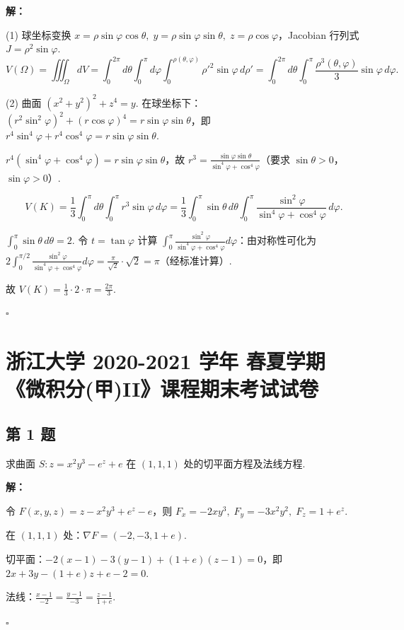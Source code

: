 \documentclass[12pt,a4paper]{article}
\newenvironment{sol}[1][解]{%
  \par\medskip\noindent\textbf{#1：}\itshape\par\noindent\ignorespaces
}{%
  \par\hfill$\square$\par\medskip
}
\begin{document}
\begin{sol}(1) 球坐标变换 $x=\rho\sin\varphi\cos\theta,\;
  y=\rho\sin\varphi\sin\theta,\; z=\rho\cos\varphi$，Jacobian 行列式
  $J=\rho^2\sin\varphi$.
  $$V(\Omega)=\iiint_{\Omega}dV=\int_0^{2\pi}d\theta\int_0^{\pi}d\varphi\int_0^{\rho(\theta,\varphi)}\rho'^2\sin\varphi\,d\rho'=\int_0^{2\pi}d\theta\int_0^{\pi}\frac{\rho^3(\theta,\varphi)}{3}\sin\varphi\,d\varphi.$$

  (2) 曲面 $(x^2+y^2)^2+z^4=y$. 在球坐标下：
  $(r^2\sin^2\varphi)^2+(r\cos\varphi)^4=r\sin\varphi\sin\theta$，即
  $r^4\sin^4\varphi+r^4\cos^4\varphi=r\sin\varphi\sin\theta$.

  $r^4(\sin^4\varphi+\cos^4\varphi)=r\sin\varphi\sin\theta$，故
  $r^3=\frac{\sin\varphi\sin\theta}{\sin^4\varphi+\cos^4\varphi}$（要求
  $\sin\theta>0$，$\sin\varphi>0$）.

  $$V(K)=\frac{1}{3}\int_0^{\pi}d\theta\int_0^{\pi}r^3\sin\varphi\,d\varphi=\frac{1}{3}\int_0^{\pi}\sin\theta\,d\theta\int_0^{\pi}\frac{\sin^2\varphi}{\sin^4\varphi+\cos^4\varphi}\,d\varphi.$$

  $\int_0^{\pi}\sin\theta\,d\theta=2$. 令 $t=\tan\varphi$ 计算
  $\int_0^{\pi}\frac{\sin^2\varphi}{\sin^4\varphi+\cos^4\varphi}d\varphi$：由对称性可化为
  $2\int_0^{\pi/2}\frac{\sin^2\varphi}{\sin^4\varphi+\cos^4\varphi}d\varphi=\frac{\pi}{\sqrt{2}}\cdot\sqrt{2}=\pi$（经标准计算）.

  故 $V(K)=\frac{1}{3}\cdot 2\cdot\pi=\frac{2\pi}{3}.$

\end{sol}
\section*{浙江大学 2020-2021 学年 春夏学期 《微积分(甲)II》课程期末考试试卷}

\subsection*{第 1 题}
求曲面 $S: z=x^2y^3-e^z+e$ 在 $(1,1,1)$ 处的切平面方程及法线方程.

\begin{sol}令 $F(x,y,z)=z-x^2y^3+e^z-e$，则 $F_x=-2xy^3,\;
  F_y=-3x^2y^2,\; F_z=1+e^z$.

  在 $(1,1,1)$ 处：$\nabla F=(-2,-3,1+e)$.

  切平面：$-2(x-1)-3(y-1)+(1+e)(z-1)=0$，即 $2x+3y-(1+e)z+e-2=0$.

  法线：$\frac{x-1}{-2}=\frac{y-1}{-3}=\frac{z-1}{1+e}$.

\end{sol}
\end{document}
